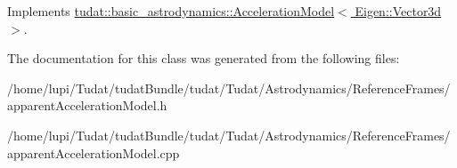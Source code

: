 Implements \hyperlink{classtudat_1_1basic__astrodynamics_1_1AccelerationModel_a966e85b72300b8cbc99ba60e40108d71}{tudat\+::basic\+\_\+astrodynamics\+::\+Acceleration\+Model$<$ Eigen\+::\+Vector3d $>$}.



The documentation for this class was generated from the following files\+:\begin{DoxyCompactItemize}
\item 
/home/lupi/\+Tudat/tudat\+Bundle/tudat/\+Tudat/\+Astrodynamics/\+Reference\+Frames/apparent\+Acceleration\+Model.\+h\item 
/home/lupi/\+Tudat/tudat\+Bundle/tudat/\+Tudat/\+Astrodynamics/\+Reference\+Frames/apparent\+Acceleration\+Model.\+cpp\end{DoxyCompactItemize}
